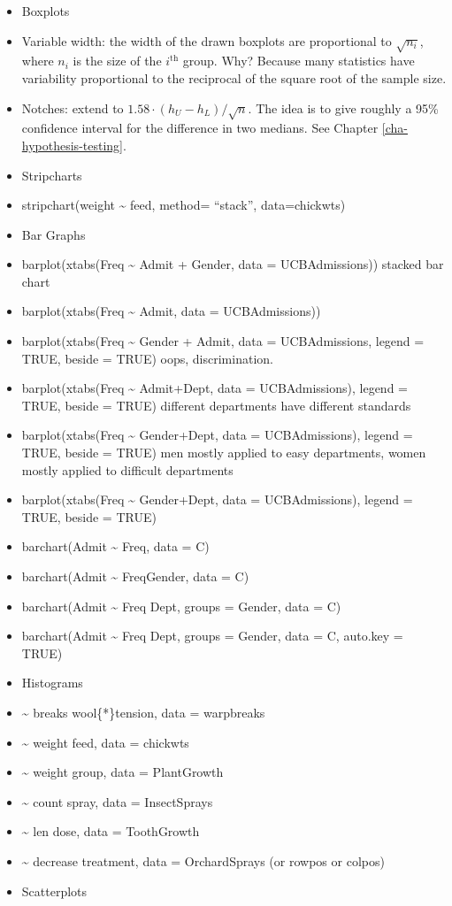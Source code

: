 \documentclass[]{book}
\providecommand{\tightlist}{%
  \setlength{\itemsep}{0pt}\setlength{\parskip}{0pt}}
\numberwithin{equation}{chapter}
\numberwithin{figure}{chapter}
\theoremstyle{plain}
\theoremstyle{definition}
\theoremstyle{remark}
\theoremstyle{definition}
\theoremstyle{definition}
\theoremstyle{remark}
\begin{document}
\begin{itemize}
\tightlist
\item
  Boxplots
\item
  Variable width: the width of the drawn boxplots are proportional to
  \(\sqrt{n_{i}}\), where \(n_{i}\) is the size of the
  \(i^{\mathrm{th}}\) group. Why? Because many statistics have
  variability proportional to the reciprocal of the square root of the
  sample size.
\item
  Notches: extend to \(1.58\cdot(h_{U}-h_{L})/\sqrt{n}\). The idea is to
  give roughly a 95\% confidence interval for the difference in two
  medians. See Chapter \ref{cha-hypothesis-testing}.
\item
  Stripcharts
\item
  stripchart(weight \textasciitilde{} feed, method= ``stack'',
  data=chickwts)
\item
  Bar Graphs
\item
  barplot(xtabs(Freq \textasciitilde{} Admit + Gender, data =
  UCBAdmissions)) stacked bar chart
\item
  barplot(xtabs(Freq \textasciitilde{} Admit, data = UCBAdmissions))
\item
  barplot(xtabs(Freq \textasciitilde{} Gender + Admit, data =
  UCBAdmissions, legend = TRUE, beside = TRUE) oops, discrimination.
\item
  barplot(xtabs(Freq \textasciitilde{} Admit+Dept, data =
  UCBAdmissions), legend = TRUE, beside = TRUE) different departments
  have different standards
\item
  barplot(xtabs(Freq \textasciitilde{} Gender+Dept, data =
  UCBAdmissions), legend = TRUE, beside = TRUE) men mostly applied to
  easy departments, women mostly applied to difficult departments
\item
  barplot(xtabs(Freq \textasciitilde{} Gender+Dept, data =
  UCBAdmissions), legend = TRUE, beside = TRUE)
\item
  barchart(Admit \textasciitilde{} Freq, data = C)
\item
  barchart(Admit \textasciitilde{} Freq\textbar{}Gender, data = C)
\item
  barchart(Admit \textasciitilde{} Freq \textbar{} Dept, groups =
  Gender, data = C)
\item
  barchart(Admit \textasciitilde{} Freq \textbar{} Dept, groups =
  Gender, data = C, auto.key = TRUE)
\item
  Histograms
\item
  \textasciitilde{} breaks \textbar{} wool\{*\}tension, data =
  warpbreaks
\item
  \textasciitilde{} weight \textbar{} feed, data = chickwts
\item
  \textasciitilde{} weight \textbar{} group, data = PlantGrowth
\item
  \textasciitilde{} count \textbar{} spray, data = InsectSprays
\item
  \textasciitilde{} len \textbar{} dose, data = ToothGrowth
\item
  \textasciitilde{} decrease \textbar{} treatment, data = OrchardSprays
  (or rowpos or colpos)
\item
  Scatterplots
\end{itemize}
\end{document}
